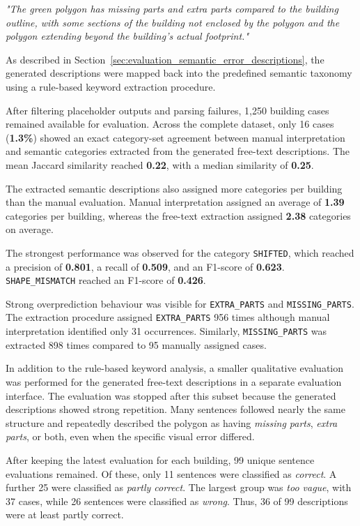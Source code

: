 \textit{"The green polygon has missing parts and extra parts compared to the building outline, with some sections of the building not enclosed by the polygon and the polygon extending beyond the building's actual footprint."}

As described in Section~\ref{sec:evaluation_semantic_error_descriptions}, the generated descriptions were mapped back into the predefined semantic taxonomy using a rule-based keyword extraction procedure.

After filtering placeholder outputs and parsing failures, 1,250 building cases remained available for evaluation. Across the complete dataset, only 16 cases (\textbf{1.3\%}) showed an exact category-set agreement between manual interpretation and semantic categories extracted from the generated free-text descriptions. The mean Jaccard similarity reached \textbf{0.22}, with a median similarity of \textbf{0.25}.

The extracted semantic descriptions also assigned more categories per building than the manual evaluation. Manual interpretation assigned an average of \textbf{1.39} categories per building, whereas the free-text extraction assigned \textbf{2.38} categories on average.

The strongest performance was observed for the category \texttt{SHIFTED}, which reached a precision of \textbf{0.801}, a recall of \textbf{0.509}, and an F1-score of \textbf{0.623}. \texttt{SHAPE\_MISMATCH} reached an F1-score of \textbf{0.426}.

Strong overprediction behaviour was visible for \texttt{EXTRA\_PARTS} and \texttt{MISSING\_PARTS}. The extraction procedure assigned \texttt{EXTRA\_PARTS} 956 times although manual interpretation identified only 31 occurrences. Similarly, \texttt{MISSING\_PARTS} was extracted 898 times compared to 95 manually assigned cases.

In addition to the rule-based keyword analysis, a smaller qualitative evaluation was performed for the generated free-text descriptions in a separate evaluation interface. The evaluation was stopped after this subset because the generated descriptions showed strong repetition. Many sentences followed nearly the same structure and repeatedly described the polygon as having \textit{missing parts}, \textit{extra parts}, or both, even when the specific visual error differed.

After keeping the latest evaluation for each building, 99 unique sentence evaluations remained. Of these, only 11 sentences were classified as \textit{correct}. A further 25 were classified as \textit{partly correct}. The largest group was \textit{too vague}, with 37 cases, while 26 sentences were classified as \textit{wrong}. Thus, 36 of 99 descriptions were at least partly correct.

